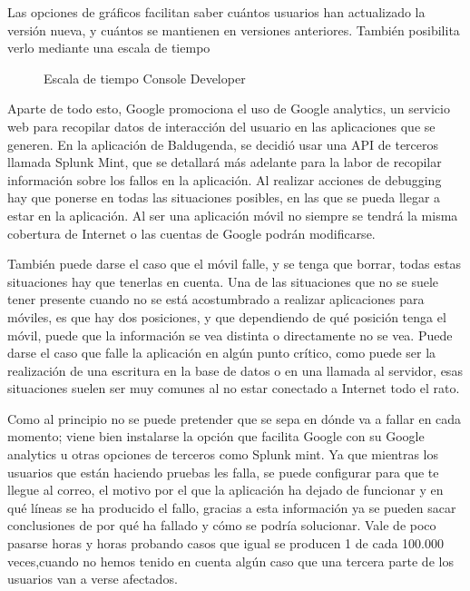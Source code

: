 Las opciones de gráficos facilitan saber cuántos usuarios han actualizado la versión nueva, y cuántos se mantienen en versiones anteriores.
También posibilita verlo mediante una escala de tiempo


\begin{figure}[H] 
  \begin{center} 
    \caption{Escala de tiempo Console Developer} 
    \label{fig:EscalaTiempo} 
  \end{center} 
\end{figure}

Aparte de todo esto, Google promociona el uso de Google analytics, un servicio web para recopilar datos de interacción del usuario en las aplicaciones que se generen.
En la aplicación de Baldugenda, se decidió usar una API de terceros llamada Splunk Mint, que se detallará más adelante para la labor de recopilar información sobre los fallos en la aplicación.
Al realizar acciones de debugging hay que ponerse en todas las situaciones posibles, en las que se pueda llegar a estar en la aplicación. Al ser una aplicación móvil no siempre se tendrá la misma cobertura de Internet o las cuentas de Google podrán modificarse.

También puede darse el caso que el móvil falle, y se tenga que borrar,  todas estas situaciones hay que tenerlas en cuenta. Una de las situaciones que no se suele tener presente cuando no se está acostumbrado a realizar aplicaciones para móviles, es que hay dos posiciones, y que dependiendo de qué posición tenga el móvil, puede que la información se vea distinta o directamente no se vea.
Puede darse el caso que falle la aplicación en algún punto crítico, como puede ser la realización de una escritura en la base de datos o en una llamada al servidor, esas situaciones suelen ser muy comunes al no estar conectado a Internet  todo el rato.

Como al principio no se puede pretender que se sepa en dónde va a fallar en cada momento; viene bien instalarse la opción que facilita Google con su Google analytics u otras opciones de terceros como Splunk mint.
Ya que mientras los usuarios que están haciendo pruebas les falla, se puede configurar para que te llegue al correo, el motivo por el que la aplicación ha dejado de funcionar y en qué líneas se ha producido el fallo, gracias a esta información ya se pueden sacar conclusiones de por qué ha fallado y cómo se podría solucionar. Vale de poco pasarse horas y horas probando casos que igual se producen 1 de cada 100.000 veces,cuando no hemos tenido en cuenta algún caso que una tercera parte de los usuarios van a verse afectados.

